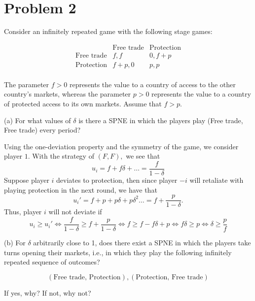 \documentclass[11pt]{article}
\begin{document}
\newpage
\section*{Problem 2}
\begin{problem}
   Consider an infinitely repeated game with the following stage games: 
\end{problem}
\[
\begin{array}{c|cc}
 & \text{Free trade} & \text{Protection} \\
\hline
\text{Free trade} & f,f & 0,f+p \\
\text{Protection} & f+p,0 & p,p \\
\end{array}
\]



The parameter $f > 0$ represents the value to a country of access to the other country's markets, whereas the parameter $p > 0$ represents the value to a country of protected access to its own markets. Assume that $f > p$.

(a) For what values of $\delta$ is there a SPNE in which the players play (Free trade, Free trade) every period?
\begin{solution}
    Using the one-deviation property and the symmetry of the game, we consider player $1.$ With the strategy of $(F,F),$ we see that
    \[u_i = f + f\delta + \dots = \frac{f}{1 - \delta}\] Suppose player $i$ deviates to protection, then since player $-i$ will retaliate with playing protection in the next round, we have that 
    \[u_i'= f + p + p\delta + p\delta^2\dots = f + \frac{p}{1- \delta}.\] Thus, player $i$ will not deviate if 
    \[u_i \geq u_i' \iff \frac{f}{1 - \delta} \geq f + \frac{p}{1 - \delta} \iff f\geq f - f\delta + p \iff f\delta \geq p \iff \delta \geq \frac{p}{f}\]
\end{solution}



(b) For $\delta$ arbitrarily close to 1, does there exist a SPNE in which the players take turns opening their markets, i.e., in which they play the following infinitely repeated sequence of outcomes?



\[
(\text{Free trade, Protection}), (\text{Protection, Free trade})
\]



If yes, why? If not, why not?
\end{document}
